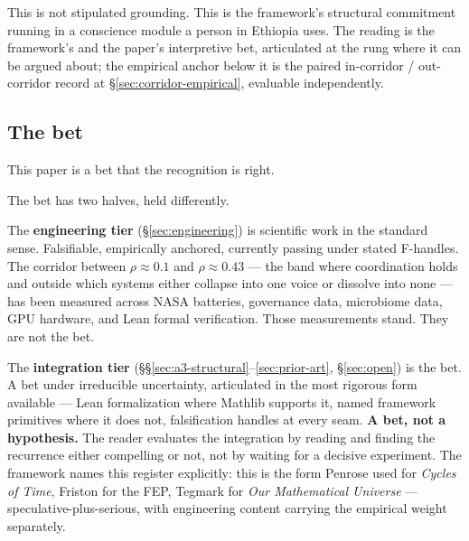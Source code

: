 \documentclass[11pt,a4paper]{article}
\begin{document}
This is not stipulated grounding. This is the framework's structural commitment running in a conscience module a person in Ethiopia uses. The reading is the framework's and the paper's interpretive bet, articulated at the rung where it can be argued about; the empirical anchor below it is the paired in-corridor / out-corridor record at \S\ref{sec:corridor-empirical}, evaluable independently.

\subsection*{The bet}

This paper is a bet that the recognition is right.

The bet has two halves, held differently.

The \textbf{engineering tier} (\S\ref{sec:engineering}) is scientific work in the standard sense. Falsifiable, empirically anchored, currently passing under stated F-handles. The corridor between $\rho \approx 0.1$ and $\rho \approx 0.43$ --- the band where coordination holds and outside which systems either collapse into one voice or dissolve into none --- has been measured across NASA batteries, governance data, microbiome data, GPU hardware, and Lean formal verification. Those measurements stand. They are not the bet.

The \textbf{integration tier} (\S\S\ref{sec:a3-structural}--\ref{sec:prior-art}, \S\ref{sec:open}) is the bet. A bet under irreducible uncertainty, articulated in the most rigorous form available --- Lean formalization where Mathlib supports it, named framework primitives where it does not, falsification handles at every seam. \textbf{A bet, not a hypothesis.} The reader evaluates the integration by reading and finding the recurrence either compelling or not, not by waiting for a decisive experiment. The framework names this register explicitly: this is the form Penrose used for \emph{Cycles of Time}, Friston for the FEP, Tegmark for \emph{Our Mathematical Universe} --- speculative-plus-serious, with engineering content carrying the empirical weight separately.
\end{document}
